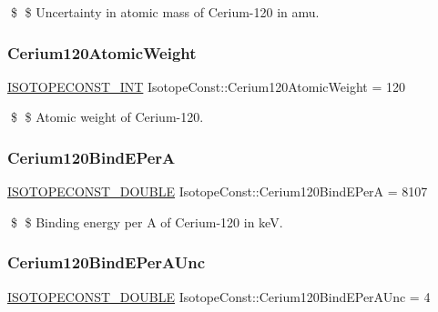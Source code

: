 \$ \$ Uncertainty in atomic mass of Cerium-\/120 in amu. \mbox{\label{group___isotope_const-_cerium-_ce120_ga06d2fd1b1f6af422833e1ede652f5af8}} 
\subsubsection{\texorpdfstring{Cerium120\+Atomic\+Weight}{Cerium120AtomicWeight}}
{\footnotesize\ttfamily \mbox{\hyperlink{group___isotope_const-_macros_ga5f18360b3e99483a35c32d789e62621c}{I\+S\+O\+T\+O\+P\+E\+C\+O\+N\+S\+T\+\_\+\+I\+NT}} Isotope\+Const\+::\+Cerium120\+Atomic\+Weight = 120}

\$ \$ Atomic weight of Cerium-\/120. \mbox{\label{group___isotope_const-_cerium-_ce120_ga76699b3910fe06c4e0be49c090d95da9}} 
\subsubsection{\texorpdfstring{Cerium120\+Bind\+E\+PerA}{Cerium120BindEPerA}}
{\footnotesize\ttfamily \mbox{\hyperlink{group___isotope_const-_macros_ga8f45a7272ce02c0b4c65c44636ed719a}{I\+S\+O\+T\+O\+P\+E\+C\+O\+N\+S\+T\+\_\+\+D\+O\+U\+B\+LE}} Isotope\+Const\+::\+Cerium120\+Bind\+E\+PerA = 8107}

\$ \$ Binding energy per A of Cerium-\/120 in keV. \mbox{\label{group___isotope_const-_cerium-_ce120_gac4e42aed7325c39e3dda94fbe0c3b6a8}} 
\subsubsection{\texorpdfstring{Cerium120\+Bind\+E\+Per\+A\+Unc}{Cerium120BindEPerAUnc}}
{\footnotesize\ttfamily \mbox{\hyperlink{group___isotope_const-_macros_ga8f45a7272ce02c0b4c65c44636ed719a}{I\+S\+O\+T\+O\+P\+E\+C\+O\+N\+S\+T\+\_\+\+D\+O\+U\+B\+LE}} Isotope\+Const\+::\+Cerium120\+Bind\+E\+Per\+A\+Unc = 4}

